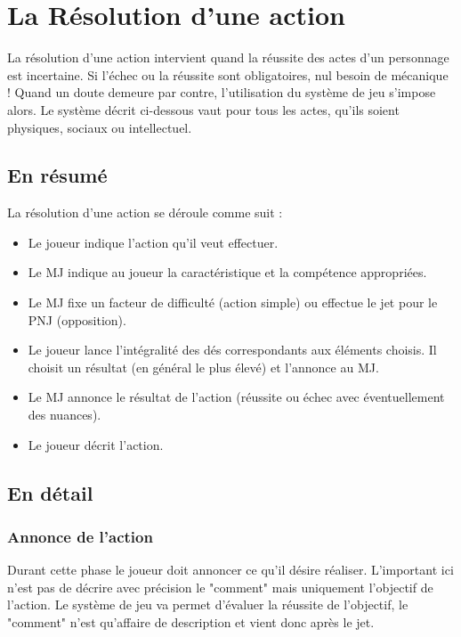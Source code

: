 \chapter{La Résolution d'une action}

La résolution d'une action intervient quand la réussite des actes d'un personnage est incertaine. Si l'échec ou la réussite sont obligatoires, nul besoin de mécanique ! Quand un doute demeure par contre, l'utilisation du système de jeu s'impose alors. Le système décrit ci-dessous vaut pour tous les actes, qu'ils soient physiques, sociaux ou intellectuel.

\section{En résumé}

La résolution d'une action se déroule comme suit : 

\begin{itemize}
\item Le joueur indique l'action qu'il veut effectuer.
\item Le MJ indique au joueur la caractéristique et la compétence appropriées.
\item Le MJ fixe un facteur de difficulté (action simple) ou effectue le jet pour le PNJ (opposition).
\item Le joueur lance l'intégralité des dés correspondants aux éléments choisis. Il choisit un résultat (en général le plus élevé) et l'annonce au MJ.
\item Le MJ annonce le résultat de l'action (réussite ou échec avec éventuellement des nuances).
\item Le joueur décrit l'action.
\end{itemize}

\section{En détail}

\subsection{Annonce de l'action}

Durant cette phase le joueur doit annoncer ce qu'il désire réaliser. L'important ici n'est pas de décrire avec précision le "comment" mais uniquement l'objectif de l'action. Le système de jeu va permet d'évaluer la réussite de l'objectif, le "comment" n'est qu'affaire de description et vient donc après le jet.

